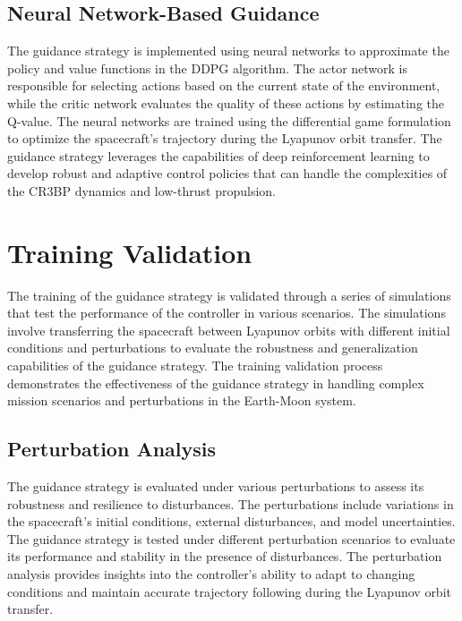 \documentclass[conference]{IEEEtran}
\begin{document}
\subsection{Neural Network-Based Guidance}
The guidance strategy is implemented using neural networks to approximate the policy and value functions in the DDPG algorithm. The actor network is responsible for selecting actions based on the current state of the environment, while the critic network evaluates the quality of these actions by estimating the Q-value. The neural networks are trained using the differential game formulation to optimize the spacecraft's trajectory during the Lyapunov orbit transfer. The guidance strategy leverages the capabilities of deep reinforcement learning to develop robust and adaptive control policies that can handle the complexities of the CR3BP dynamics and low-thrust propulsion.


% 
% 

% 




\section{Training Validation}
The training of the guidance strategy is validated through a series of simulations that test the performance of the controller in various scenarios. The simulations involve transferring the spacecraft between Lyapunov orbits with different initial conditions and perturbations to evaluate the robustness and generalization capabilities of the guidance strategy. The training validation process demonstrates the effectiveness of the guidance strategy in handling complex mission scenarios and perturbations in the Earth-Moon system.	
\subsection{Perturbation Analysis}
The guidance strategy is evaluated under various perturbations to assess its robustness and resilience to disturbances. The perturbations include variations in the spacecraft's initial conditions, external disturbances, and model uncertainties. The guidance strategy is tested under different perturbation scenarios to evaluate its performance and stability in the presence of disturbances. The perturbation analysis provides insights into the controller's ability to adapt to changing conditions and maintain accurate trajectory following during the Lyapunov orbit transfer.
\end{document}
